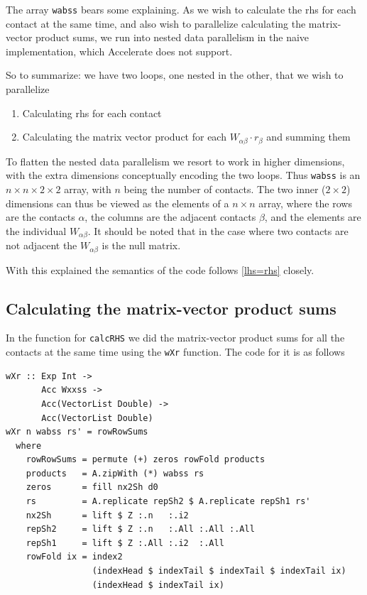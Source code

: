 \documentclass[runningheads,a4paper]{llncs}
\begin{document}
The array \texttt{wabss} bears some explaining.
As we wish to calculate the rhs for each contact at the same time,
and also wish to parallelize calculating the matrix-vector product sums,
we run into nested data parallelism in the naive implementation,
which Accelerate does not support.

So to summarize: we have two loops, one nested in the other, that we wish to parallelize
\begin{enumerate}
\item Calculating rhs for each contact
\item Calculating the matrix vector product for each $W_{\alpha\beta} \cdot r_{\beta}$ and summing them
\end{enumerate}

To flatten the nested data parallelism we resort to work in higher dimensions,
with the extra dimensions conceptually encoding the two loops.
Thus \texttt{wabss} is an $n \times n \times 2 \times 2$ array,
with $n$ being the number of contacts.
The two inner ($2 \times 2$) dimensions can thus be viewed
as the elements of a $n \times n$ array,
where the rows are the contacts $\alpha$,
the columns are the adjacent contacts $\beta$,
and the elements are the individual $W_{\alpha\beta}$.
It should be noted that in the case where two contacts are not adjacent
the $W_{\alpha\beta}$ is the null matrix.

With this explained the semantics of the code follows \eqref{lhs=rhs} closely.

\subsection{Calculating the matrix-vector product sums}
In the function for \texttt{calcRHS} we did the matrix-vector product sums
for all the contacts at the same time using the \texttt{wXr} function.
The code for it is as follows
\begin{verbatim}
wXr :: Exp Int ->
       Acc Wxxss ->
       Acc(VectorList Double) ->
       Acc(VectorList Double)
wXr n wabss rs' = rowRowSums
  where
    rowRowSums = permute (+) zeros rowFold products
    products   = A.zipWith (*) wabss rs
    zeros      = fill nx2Sh d0
    rs         = A.replicate repSh2 $ A.replicate repSh1 rs'
    nx2Sh      = lift $ Z :.n   :.i2
    repSh2     = lift $ Z :.n   :.All :.All :.All
    repSh1     = lift $ Z :.All :.i2  :.All
    rowFold ix = index2
                 (indexHead $ indexTail $ indexTail $ indexTail ix)
                 (indexHead $ indexTail ix)
\end{verbatim}
\end{document}
